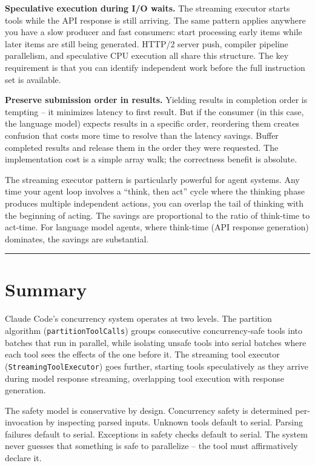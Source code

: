 \documentclass[
  english,
  11pt,
  letterpaper,
]{book}
\begin{document}
\textbf{Speculative execution during I/O waits.} The streaming executor
starts tools while the API response is still arriving. The same pattern
applies anywhere you have a slow producer and fast consumers: start
processing early items while later items are still being generated.
HTTP/2 server push, compiler pipeline parallelism, and speculative CPU
execution all share this structure. The key requirement is that you can
identify independent work before the full instruction set is available.

\textbf{Preserve submission order in results.} Yielding results in
completion order is tempting -- it minimizes latency to first result.
But if the consumer (in this case, the language model) expects results
in a specific order, reordering them creates confusion that costs more
time to resolve than the latency savings. Buffer completed results and
release them in the order they were requested. The implementation cost
is a simple array walk; the correctness benefit is absolute.

The streaming executor pattern is particularly powerful for agent
systems. Any time your agent loop involves a ``think, then act'' cycle
where the thinking phase produces multiple independent actions, you can
overlap the tail of thinking with the beginning of acting. The savings
are proportional to the ratio of think-time to act-time. For language
model agents, where think-time (API response generation) dominates, the
savings are substantial.

\begin{center}\rule{0.5\linewidth}{0.5pt}\end{center}

\section{Summary}\label{summary-1}

Claude Code's concurrency system operates at two levels. The partition
algorithm (\texttt{partitionToolCalls}) groups consecutive
concurrency-safe tools into batches that run in parallel, while
isolating unsafe tools into serial batches where each tool sees the
effects of the one before it. The streaming tool executor
(\texttt{StreamingToolExecutor}) goes further, starting tools
speculatively as they arrive during model response streaming,
overlapping tool execution with response generation.

The safety model is conservative by design. Concurrency safety is
determined per-invocation by inspecting parsed inputs. Unknown tools
default to serial. Parsing failures default to serial. Exceptions in
safety checks default to serial. The system never guesses that something
is safe to parallelize -- the tool must affirmatively declare it.
\end{document}
